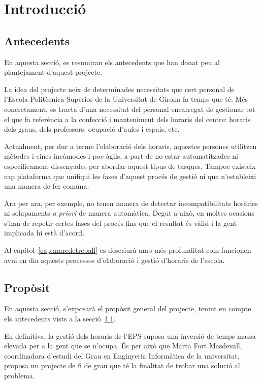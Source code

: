 \documentclass[a4paper,12pt]{ThesisStyle}
\begin{document}
\mainmatter

\chapter{Introducció}
\label{cap:intro}

\section{Antecedents}
\label{sec:antecedents}

En aquesta secció, es resumiran els antecedents que han donat peu al plantejament d'aquest projecte.

La idea del projecte neix de determinades necessitats que cert personal de l'Escola Politècnica Superior de la Universitat de Girona fa temps que té. Més concretament, es tracta d'una necessitat del personal encarregat de gestionar tot el que fa referència a la confecció i manteniment dels horaris del centre: horaris dels graus, dels professors, ocupació d'aules i espais, etc.

Actualment, per dur a terme l'elaboració dels horaris, aquestes persones utilitzen mètodes i eines incòmodes i poc àgils, a part de no estar automatitzades ni específicament dissenyades per abordar aquest tipus de tasques. Tampoc existeix cap plataforma que unifiqui les fases d'aquest procés de gestió ni que n'estableixi una manera de fer comuna.

Ara per ara, per exemple, no tenen manera de detectar incompatibilitats horàries ni solapaments \textit{a priori} de manera automàtica. Degut a això, en moltes ocasions s'han de repetir certes fases del procés fins que el resultat és vàlid i la gent implicada hi està d'acord.

Al capítol~\ref{cap:marcdetreball} es descriurà amb més profunditat com funcionen avui en dia aquests processos d'elaboració i gestió d'horaris de l'escola.

\section{Propòsit}
\label{sec:proposit}

En aquesta secció, s'exposarà el propòsit general del projecte, tenint en compte els antecedents vists a la secció~\ref{sec:antecedents}.

En definitiva, la gestió dels horaris de l'EPS suposa una inversió de temps massa elevada per a la gent que se n'ocupa. És per això que Marta Fort Masdevall, coordinadora d'estudi del Grau en Enginyeria Informàtica de la universitat, proposa un projecte de fi de grau que té la finalitat de trobar una solució al problema.
\end{document}
